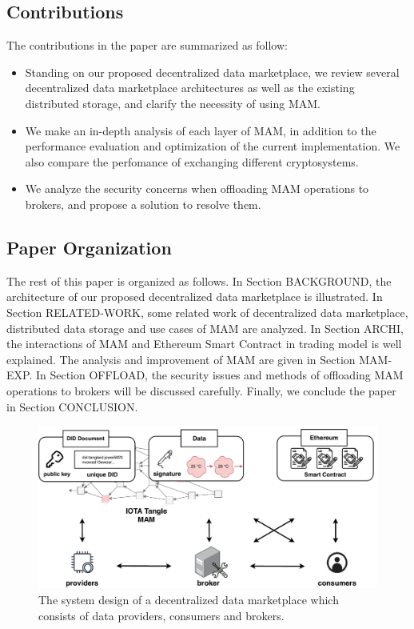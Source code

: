 \documentclass[conference]{IEEEtran}
\begin{document}
\subsection{Contributions}
The contributions in the paper are summarized as follow:
\begin{itemize}
	\item Standing on our proposed decentralized data marketplace, we review several decentralized data marketplace architectures as well as the existing distributed storage, and clarify the necessity of using MAM.  
    \item We make an in-depth analysis of each layer of MAM, in addition to the performance evaluation and optimization of the current implementation. We also compare the perfomance of exchanging different cryptosystems.
	\item We analyze the security concerns when offloading MAM operations to brokers, and propose a solution to resolve them.
\end{itemize}


\subsection{Paper Organization}
The rest of this paper is organized as follows. In Section BACKGROUND, the architecture of our proposed decentralized data marketplace is illustrated. In Section RELATED-WORK, some related work of decentralized data marketplace, distributed data storage and use cases of MAM are analyzed. In Section ARCHI, the interactions of MAM and Ethereum Smart Contract in trading model is well explained. The analysis and improvement of MAM are given in Section MAM-EXP. In Section OFFLOAD, the security issues and methods of offloading MAM operations to brokers will be discussed carefully. Finally, we conclude the paper in Section CONCLUSION.


\begin{figure}[!t]
    \centering
    \includegraphics[width=3.in]{system_design}
    \caption{The system design of a decentralized data marketplace which consists of data providers, consumers and brokers.}
    \label{fig:system_design}
\end{figure}
\end{document}
